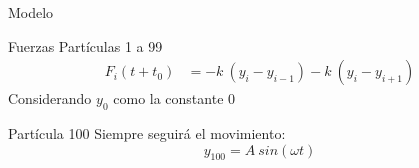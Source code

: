 \begin{frame}{Modelo}
    \begin{block}{Fuerzas Partículas 1 a 99}
        \begin{equation*}
            \begin{aligned}
                F_i(t+t_0) &= -k\ (y_i - y_{i-1}) - k\ (y_i - y_{i+1})
            \end{aligned}\label{eq:equation-particles-movement}
        \end{equation*}
        Considerando \( y_0 \) como la constante 0
    \end{block}

    \begin{block}{Partícula 100}
        Siempre seguirá el movimiento: \begin{equation*} y_{100}=A\ sin(\omega t)\end{equation*}
    \end{block}
\end{frame}


